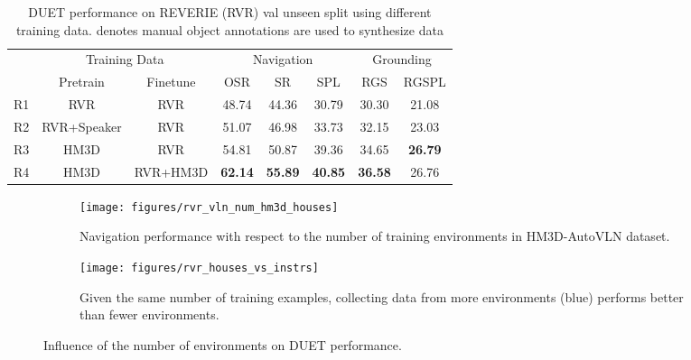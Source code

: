 \begin{table}[t]
\centering
\tabcolsep=0.13cm
\caption{DUET performance on REVERIE (RVR) val unseen split using different training data.  denotes manual object annotations are used to synthesize data}
\label{tab:rvr_instr_vln}
\begin{tabular}{lccccccc} \toprule
\multirow{2}{*}{} & \multicolumn{2}{c}{Training Data} & \multicolumn{3}{c}{Navigation} & \multicolumn{2}{c}{Grounding} \\
 & Pretrain & Finetune & OSR & SR & SPL & RGS & RGSPL \\ \midrule
R1 & RVR & RVR & 48.74 & 44.36 & 30.79 & 30.30 & 21.08 \\
R2 & RVR+Speaker & RVR & 51.07 & 46.98 & 33.73 & 32.15 & 23.03 \\
R3 & HM3D & RVR & 54.81 & 50.87 & 39.36 & 34.65 & \textbf{26.79} \\
R4 & HM3D & RVR+HM3D & \textbf{62.14} & \textbf{55.89} & \textbf{40.85} & \textbf{36.58} & 26.76 \\ \bottomrule
\end{tabular}
\end{table}

\begin{figure}[t]
    \centering
    \begin{subfigure}[b]{0.48\linewidth}
        \texttt{[image: figures/rvr\_vln\_num\_hm3d\_houses]}
        \caption{Navigation performance with respect to the number of training environments in HM3D-AutoVLN dataset.}
        \label{fig:rvr_vln_num_hm3d_environments}
    \end{subfigure}
    \hfill
    \begin{subfigure}[b]{0.48\linewidth}
        \centering
        \texttt{[image: figures/rvr\_houses\_vs\_instrs]}
        \caption{Given the same number of training examples, collecting data from more environments (blue) performs better than fewer environments.}
        \label{fig:rvr_environments_vs_instrs}
    \end{subfigure}
    \caption{Influence of the number of environments on DUET performance.}
    \label{fig:three graphs}
\end{figure}


